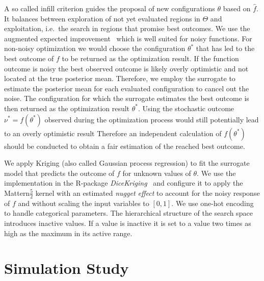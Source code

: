 \documentclass[bimj,fleqn]{w-art}
\theoremstyle{plain}
\theoremstyle{definition}
\begin{document}
A so called infill criterion guides the proposal of new configurations $\theta$ based on $\hat{f}$.
It balances between exploration of not yet evaluated regions in $\Theta$ and exploitation, i.e.\ the search in regions that promise best outcomes.
We use the augmented expected improvement~\citep{huang_global_2006} which is well suited for noisy functions.
For non-noisy optimization we would choose the configuration $\theta^\ast$ that has led to the best outcome of $f$ to be returned as the optimization result.
If the function outcome is noisy the best observed outcome is likely overly optimistic and not located at the true posterior mean.
Therefore, we employ the surrogate to estimate the posterior mean for each evaluated configuration to cancel out the noise.
The configuration for which the surrogate estimates the best outcome is then returned as the optimization result $\theta^\ast$.
Using the stochastic outcome $\nu^\ast = f(\theta^\ast)$ observed during the optimization process would still potentially lead to an overly optimistic result
Therefore an independent calculation of $f(\theta^\ast)$ should be conducted to obtain a fair estimation of the reached best outcome.

We apply Kriging (also called Gaussian process regression) to fit the surrogate model that predicts the outcome of $f$ for unknown values of $\theta$.
We use the implementation in the R-package \emph{DiceKriging}~\citep{roustant_dicekriging_2012} and configure it to apply the Mattern$\frac{5}{2}$ kernel with an estimated \emph{nugget effect} to account for the noisy response of $f$ and without scaling the input variables to $[0,1]$.
We use one-hot encoding to handle categorical parameters.
The hierarchical structure of the search space introduces inactive values.
If a value is inactive it is set to a value two times as high as the maximum in its active range.

\section{Simulation Study}
\end{document}
